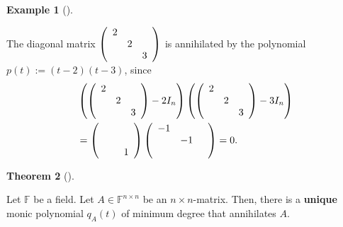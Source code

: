 \documentclass[numbers=enddot,12pt,final,onecolumn,notitlepage]{scrartcl}%
\numberwithin{exer}{subsection}
\theoremstyle{definition}
\newtheorem{theo}{Theorem}[subsection]
\newenvironment{theorem}[1][]
{\begin{theo}[#1]\begin{leftbar}}
{\end{leftbar}\end{theo}}
\newtheorem{exam}[theo]{Example}
\newenvironment{example}[1][]
{\begin{exam}[#1]\begin{leftbar}}
{\end{leftbar}\end{exam}}
\begin{document}
\begin{example}
The diagonal matrix $\left(
\begin{array}
[c]{ccc}%
2 &  & \\
& 2 & \\
&  & 3
\end{array}
\right)  $ is annihilated by the polynomial $p\left(  t\right)  :=\left(
t-2\right)  \left(  t-3\right)  $, since%
\begin{align*}
&  \left(  \left(
\begin{array}
[c]{ccc}%
2 &  & \\
& 2 & \\
&  & 3
\end{array}
\right)  -2I_{n}\right)  \left(  \left(
\begin{array}
[c]{ccc}%
2 &  & \\
& 2 & \\
&  & 3
\end{array}
\right)  -3I_{n}\right) \\
&  =\left(
\begin{array}
[c]{ccc}
&  & \\
&  & \\
&  & 1
\end{array}
\right)  \left(
\begin{array}
[c]{ccc}%
-1 &  & \\
& -1 & \\
&  &
\end{array}
\right)  =0.
\end{align*}

\end{example}

\begin{theorem}
\label{thm.jnf.mipo.unique}Let $\mathbb{F}$ be a field. Let $A\in
\mathbb{F}^{n\times n}$ be an $n\times n$-matrix. Then, there is a
\textbf{unique} monic polynomial $q_{A}\left(  t\right)  $ of minimum degree
that annihilates $A$.
\end{theorem}
\end{document}

